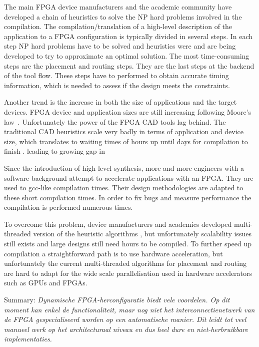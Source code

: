 \documentclass[a4paper,oneside,12pt]{article}
\begin{document}
The main FPGA device manufacturers and the academic community have developed a chain of heuristics to solve the NP hard problems involved in the compilation.
The compilation/translation of a high-level description of the application to a FPGA configuration is typically divided in several steps. In each step NP hard problems have to be solved and heuristics were and are being developed to try to approximate an optimal solution. The most time-consuming steps are the placement and routing steps. They are the last steps at the backend of the tool flow. These steps have to performed to obtain accurate timing information, which is needed to assess if the design meets the constraints. 
 
Another trend is the increase in both the size of applications and the target devices. FPGA device and application sizes are still increasing following Moore's law~\cite{shannon2015technology}. Unfortunately the power of the FPGA CAD tools lag behind. The traditional CAD heuristics scale very badly in terms of application and device size, which translates to waiting times of hours up until days for compilation to finish \cite{murray2015timing}. 
leading to growing gap in 

Since the introduction of high-level synthesis\cite{}, more and more engineers with a software background attempt to accelerate applications with an FPGA. They are used to gcc-like compilation times. Their design methodologies are adapted to these short compilation times. In order to fix bugs and measure performance the compilation is performed numerous times.

To overcome this problem, device manufacturers and academics developed multi-threaded version of the heuristic algorithms \cite{ludwin2011,gort2012,betz2013method,jain2014multi}, but unfortunately scalability issues still exists and large designs still need hours to be compiled. To further speed up compilation a straightforward path is to use hardware acceleration, but unfortunately the current multi-threaded algorithms for placement and routing are hard to adapt for the wide scale parallelisation used in hardware accelerators such as GPUs and FPGAs.

Summary: \emph{Dynamische FPGA-herconfiguratie biedt vele voordelen. Op dit moment kan enkel de functionaliteit, maar nog niet het interconnectienetwerk van de FPGA gespecialiseerd worden op een automatische manier. Dit leidt tot veel manueel werk op het architecturaal niveau en dus heel dure en niet-herbruikbare implementaties.} 
\end{document}
